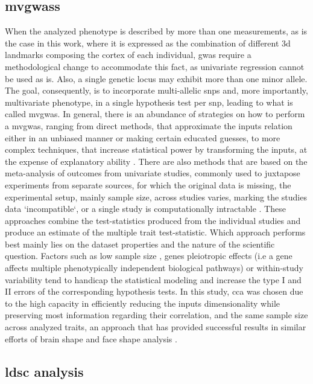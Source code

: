 \subsection{\Acfp{mvgwas}}
When the analyzed phenotype is described by more than one measurements, as is the case in this work, where it is expressed as the combination of different \ac{3d} landmarks composing the cortex of each individual, \ac{gwas} require a methodological change to accommodate this fact, as univariate regression cannot be used as is. Also, a single genetic locus may exhibit more than one minor allele. The goal, consequently, is to incorporate multi-allelic \acsp{snp} and, more importantly, multivariate phenotype, in a single hypothesis test per \ac{snp}, leading to what is called \acf{mvgwas}. In general, there is an abundance of strategies on how to perform a \ac{mvgwas}, ranging from direct methods, that approximate the inputs relation either in an unbiased manner or making certain educated guesses, to more complex techniques, that increase statistical power by transforming the inputs, at the expense of explanatory ability \cite{Galesloot2014}. There are also methods that are based on the meta-analysis of outcomes from univariate studies, commonly used to juxtapose experiments from separate sources, for which the original data is missing, the experimental setup, mainly sample size, across studies varies, marking the studies data `incompatible`, or a single study is computationally intractable \cite{Uffelmann2021,Cichonska2016}. These approaches combine the test-statistics produced from the individual studies and produce an estimate of the multiple trait test-statistic. Which approach performs best mainly lies on the dataset properties and the nature of the scientific question. Factors such as low sample size \cite{Sheng2021}, genes pleiotropic effects \cite{Fernandes2021} (i.e a gene affects multiple phenotypically independent biological pathways) or within-study variability \cite{Usui2021,Jackson2011} tend to handicap the statistical modeling and increase the type I and II errors of the corresponding hypothesis tests. In this study, \ac{cca} was chosen due to the high capacity in efficiently reducing the inputs dimensionality while preserving most information regarding their correlation, and the same sample size across analyzed traits, an approach that has provided successful results in similar efforts of brain shape and face shape analysis \cite{Claes2018,Naqvi2021}.

\subsection{\Ac{ldsc} analysis}

